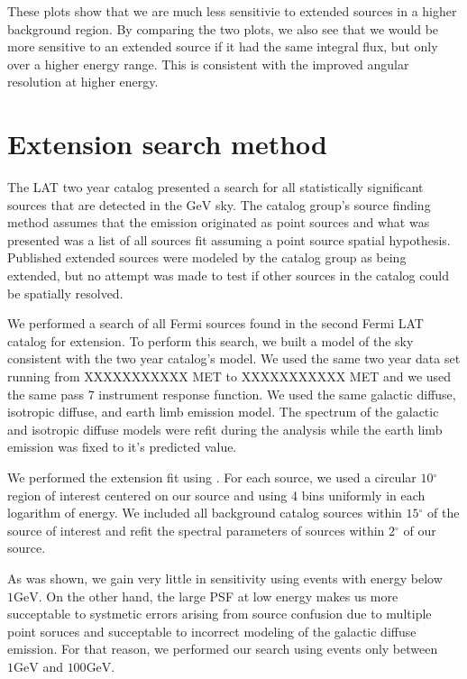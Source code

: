 \documentclass[preprint]{aastex}
\newcommand{\gev}{\text{GeV}\xspace}
\renewcommand{\deg}{\ensuremath{^\circ}\xspace}
\newcommand{\pointlike}{\text{\em pointlike}\xspace}
\begin{document}
These plots show that we are much less sensitivie to extended sources in
a higher background region. By comparing the two plots, we also see that
we would be more sensitive to an extended source if it had the same
integral flux, but only over a higher energy range. This is 
consistent with the improved angular resolution at higher energy.

\section{Extension search method}

The LAT two year catalog presented a search for all
statistically significant sources that are detected in the $\gev$
sky\cite{2FGL_catalog}.  The catalog group's source finding method assumes
that the emission originated as point sources and what was presented was
a list of all sources fit assuming a point source spatial hypothesis. 
Published extended sources were modeled by the catalog group as 
being extended, but no attempt was made to test if other sources in the catalog
could be spatially resolved.

We performed a search of all Fermi sources found in the second Fermi LAT
catalog for extension.  To perform this search, we built a model of the
sky consistent with the two year catalog's model.   We used the same two
year data set running from XXXXXXXXXXX MET to XXXXXXXXXXX MET and we used
the same pass 7 instrument response function.  We used the same galactic
diffuse, isotropic diffuse, and earth limb emission model. The spectrum of
the galactic and isotropic diffuse models were refit during the analysis
while the earth limb emission was fixed to it's predicted value.

We performed the extension fit using \pointlike.  For each source, we
used a circular $10\deg$ region of interest centered on our source and
using 4 bins uniformly in each logarithm of energy.  We included all
background catalog sources within $15\deg$ of the source of interest
and refit the spectral parameters of sources within $2\deg$ of our source.

As was shown, we gain very little in sensitivity using events with energy
below $1\gev$. On the other hand, the large PSF at low energy makes us
more succeptable to systmetic errors arising from source confusion due
to multiple point soruces and succeptable to incorrect modeling of the
galactic diffuse emission.  For that reason, we performed our search
using events only between $1\gev$ and $100\gev$.
\end{document}
